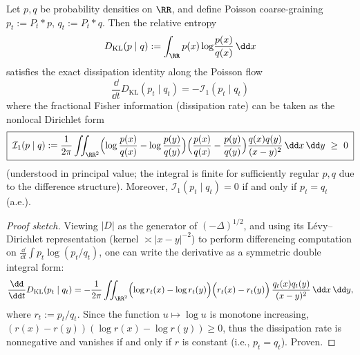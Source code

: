 \begin{proposition}\label{prop:xi-poisson-kl-dissipation-fractional-fisher}
Let \(p,q\) be probability densities on \(\RR\), and define Poisson coarse-graining \(p_t:=P_t*p\), \(q_t:=P_t*q\).
Then the relative entropy
\[
D_{\mathrm{KL}}(p\mid q):=\int_{\RR} p(x)\log\!\frac{p(x)}{q(x)}\,\dd x
\]
satisfies the exact dissipation identity along the Poisson flow
\[
\boxed{\;
\frac{\dd}{\dd t}D_{\mathrm{KL}}(p_t\mid q_t)=-\mathcal I_1(p_t\mid q_t)\;}
\]
where the fractional Fisher information (dissipation rate) can be taken as the nonlocal Dirichlet form
\[
\boxed{\;
\mathcal I_1(p\mid q)
:=\frac{1}{2\pi}\iint_{\RR^2}
\Bigl(\log\frac{p(x)}{q(x)}-\log\frac{p(y)}{q(y)}\Bigr)
\Bigl(\frac{p(x)}{q(x)}-\frac{p(y)}{q(y)}\Bigr)
\frac{q(x)q(y)}{(x-y)^2}\,\dd x\,\dd y\ \ge\ 0\;}
\]
(understood in principal value; the integral is finite for sufficiently regular \(p,q\) due to the difference structure).
Moreover, \(\mathcal I_1(p_t\mid q_t)=0\) if and only if \(p_t=q_t\) (a.e.).
\end{proposition}
\begin{proof}[Proof sketch]
Viewing \(|D|\) as the generator of \((-\Delta)^{1/2}\), and using its Lévy--Dirichlet representation (kernel \(\asymp |x-y|^{-2}\)) to perform differencing computation on
\(
\frac{\dd}{\dd t}\int p_t\log(p_t/q_t)
\),
one can write the derivative as a symmetric double integral form:
\[
\frac{\dd}{\dd t}D_{\mathrm{KL}}(p_t\mid q_t)
=-\frac{1}{2\pi}\iint_{\RR^2}
\Bigl(\log r_t(x)-\log r_t(y)\Bigr)\Bigl(r_t(x)-r_t(y)\Bigr)\,
\frac{q_t(x)q_t(y)}{(x-y)^2}\,\dd x\,\dd y,
\]
where \(r_t:=p_t/q_t\).
Since the function \(u\mapsto \log u\) is monotone increasing, \((r(x)-r(y))(\log r(x)-\log r(y))\ge 0\), thus the dissipation rate is nonnegative and vanishes if and only if \(r\) is constant (i.e., \(p_t=q_t\)). Proven.
\end{proof}

